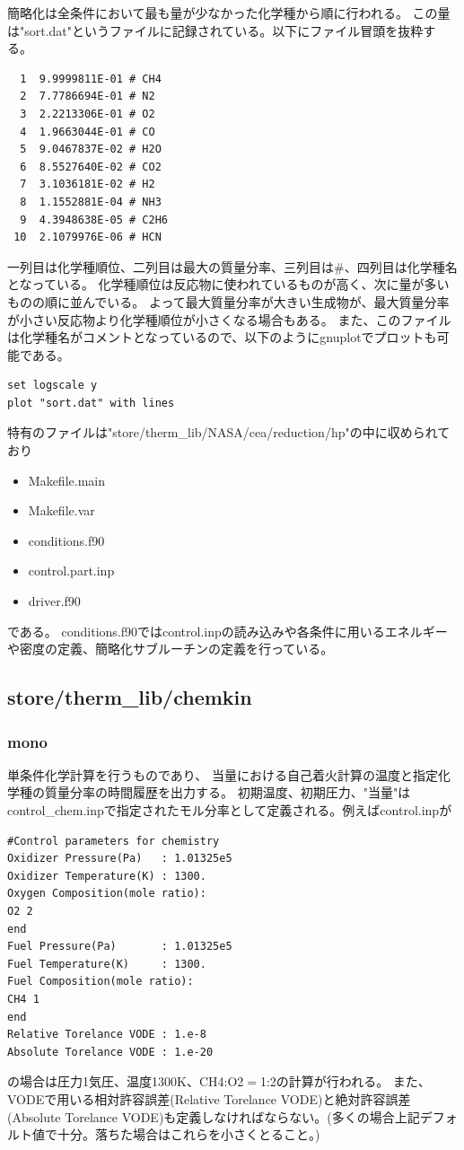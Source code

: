 \documentclass{jsarticle}
\begin{document}
簡略化は全条件において最も量が少なかった化学種から順に行われる。
この量は"sort.dat"というファイルに記録されている。以下にファイル冒頭を抜粋する。
\begin{verbatim}
  1  9.9999811E-01 # CH4               
  2  7.7786694E-01 # N2                
  3  2.2213306E-01 # O2                
  4  1.9663044E-01 # CO                
  5  9.0467837E-02 # H2O               
  6  8.5527640E-02 # CO2               
  7  3.1036181E-02 # H2                
  8  1.1552881E-04 # NH3               
  9  4.3948638E-05 # C2H6              
 10  2.1079976E-06 # HCN               
\end{verbatim}
一列目は化学種順位、二列目は最大の質量分率、三列目は\#、四列目は化学種名となっている。
化学種順位は反応物に使われているものが高く、次に量が多いものの順に並んでいる。
よって最大質量分率が大きい生成物が、最大質量分率が小さい反応物より化学種順位が小さくなる場合もある。
また、このファイルは化学種名がコメントとなっているので、以下のようにgnuplotでプロットも可能である。
\begin{verbatim}
set logscale y
plot "sort.dat" with lines
\end{verbatim}

\hspace{1em}

特有のファイルは"store/therm\_lib/NASA/cea/reduction/hp"の中に収められており
\begin{itemize}
\item Makefile.main
\item Makefile.var
\item conditions.f90
\item control.part.inp
\item driver.f90
\end{itemize}
である。
conditions.f90ではcontrol.inpの読み込みや各条件に用いるエネルギーや密度の定義、簡略化サブルーチンの定義を行っている。
\subsection{store/therm\_lib/chemkin}%
\subsubsection{mono}%
単条件化学計算を行うものであり、
当量における自己着火計算の温度と指定化学種の質量分率の時間履歴を出力する。
初期温度、初期圧力、"当量"はcontrol\_chem.inpで指定されたモル分率として定義される。例えばcontrol.inpが
\begin{verbatim}
#Control parameters for chemistry
Oxidizer Pressure(Pa)   : 1.01325e5
Oxidizer Temperature(K) : 1300.
Oxygen Composition(mole ratio):
O2 2
end
Fuel Pressure(Pa)       : 1.01325e5
Fuel Temperature(K)     : 1300.
Fuel Composition(mole ratio):
CH4 1
end
Relative Torelance VODE : 1.e-8
Absolute Torelance VODE : 1.e-20
\end{verbatim}
の場合は圧力1気圧、温度1300K、CH4:O2$=$1:2の計算が行われる。
また、VODEで用いる相対許容誤差(Relative Torelance VODE)と絶対許容誤差(Absolute Torelance VODE)も定義しなければならない。(多くの場合上記デフォルト値で十分。落ちた場合はこれらを小さくとること。)
\end{document}
